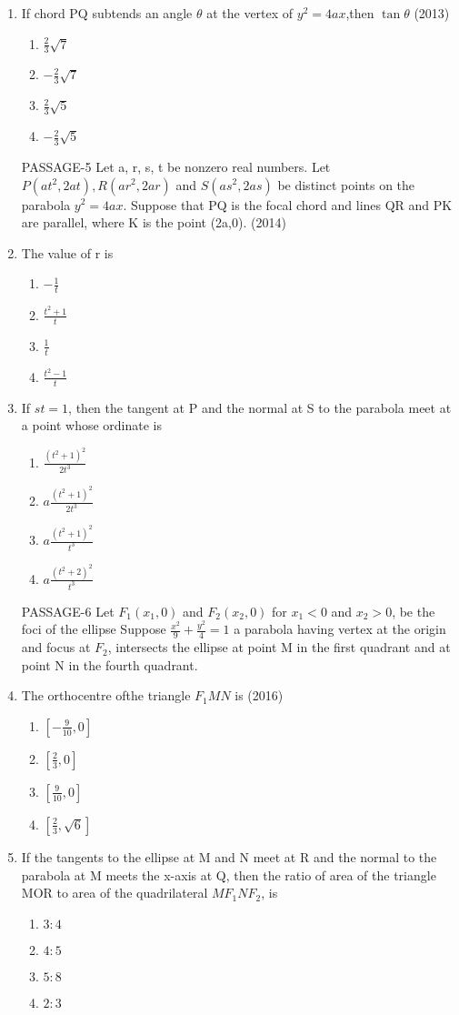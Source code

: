 \documentclass[12pt]{article}
\providecommand{\sbrak}[1]{\ensuremath{{}\left[#1\right]}}
\begin{document}
\begin{enumerate}
\begin{enumerate}
\end{enumerate}
\item If chord PQ subtends an angle $\theta$ at the vertex of $y^2=4ax$,then 
$\tan \theta$ (2013)
\begin{enumerate}
\item $\frac{2}{3}\sqrt{7}$
\item $-\frac{2}{3}\sqrt{7}$
\item $\frac{2}{3}\sqrt{5}$
\item $-\frac{2}{3}\sqrt{5}$
\end{enumerate}
PASSAGE-5
Let a, r, s, t be nonzero real numbers. Let $P(at^2,2at), R(ar^2,2ar)$ and $S(as^2,2as)$ be distinct points on the parabola $y^2=4ax$. Suppose that PQ is the focal chord and lines QR and PK are parallel, where K is the point (2a,0). (2014)
\item The value of r is 
\begin{enumerate}
\item $-\frac{1}{t}$
\item $\frac{t^2+1}{t}$
\item $\frac{1}{t}$
\item $\frac{t^2-1}{t}$
\end{enumerate}
\item If $st=1$, then the tangent at P and the normal at S to the parabola meet at a point whose ordinate is
\begin{enumerate}
\item $\frac{(t^2+1)^2}{2t^3}$
\item $a\frac{(t^2+1)^2}{2t^3}$
\item $a\frac{(t^2+1)^2}{t^3}$
\item $a\frac{(t^2+2)^2}{t^3}$
\end{enumerate}
PASSAGE-6
Let $F_1(x_1,0)$ and $F_2(x_2,0)$ for $x_1<0$ and $x_2>0$, be the foci of the ellipse Suppose $\frac{x^2}{9}+\frac{y^2}{4}=1$ a parabola having vertex at the origin and focus at $F_2$, intersects the ellipse at point M in the first quadrant and at point N in the fourth quadrant.
\item The orthocentre ofthe triangle $F_1MN$ is (2016)
\begin{enumerate}
\item $\sbrak{-\frac{9}{10},0}$
\item $\sbrak{\frac{2}{3},0}$
\item $\sbrak{\frac{9}{10},0}$
\item $\sbrak{\frac{2}{3},\sqrt{6}}$
\end{enumerate}
\item If the tangents to the ellipse at M and N meet at R and the normal to the parabola at M meets the x-axis at Q, then the ratio of area of the triangle MOR to area of the quadrilateral $MF_1NF_2$, is
\begin{enumerate}
\item $3:4$
\item $4:5$
\item $5:8$
\item $2:3$
\end{enumerate}
\end{enumerate}
\end{document}
